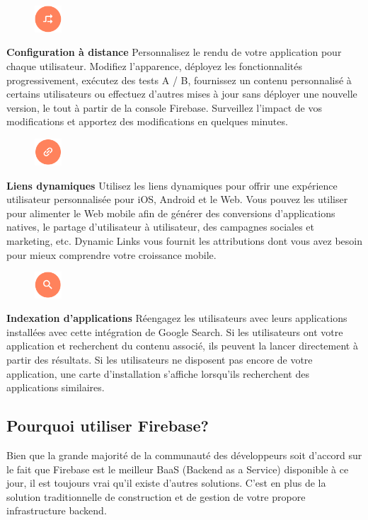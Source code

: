 \begin{figure}
	\includegraphics[width=1cm]{Images/chapter2/firebase_services/remote_config.png}
\end{figure}
\textbf{Configuration à distance} Personnalisez le rendu de votre application pour chaque utilisateur. Modifiez l'apparence, déployez les fonctionnalités progressivement, exécutez des tests A / B, fournissez un contenu personnalisé à certains utilisateurs ou effectuez d'autres mises à jour sans déployer une nouvelle version, le tout à partir de la console Firebase. Surveillez l'impact de vos modifications et apportez des modifications en quelques minutes.\medskip

\begin{figure}
	\includegraphics[width=1cm]{Images/chapter2/firebase_services/dynamic_links.png}
\end{figure}
\textbf{Liens dynamiques} Utilisez les liens dynamiques pour offrir une expérience utilisateur personnalisée pour iOS, Android et le Web. Vous pouvez les utiliser pour alimenter le Web mobile afin de générer des conversions d'applications natives, le partage d'utilisateur à utilisateur, des campagnes sociales et marketing, etc. Dynamic Links vous fournit les attributions dont vous avez besoin pour mieux comprendre votre croissance mobile.\medskip

\begin{figure}
	\includegraphics[width=1cm]{Images/chapter2/firebase_services/app_indexing.png}
\end{figure}
\textbf{Indexation d'applications} Réengagez les utilisateurs avec leurs applications installées avec cette intégration de Google Search. Si les utilisateurs ont votre application et recherchent du contenu associé, ils peuvent la lancer directement à partir des résultats. Si les utilisateurs ne disposent pas encore de votre application, une carte d'installation s'affiche lorsqu'ils recherchent des applications similaires.\medskip

\subsection{Pourquoi utiliser Firebase?}
Bien que la grande majorité de la communauté des développeurs soit d’accord sur le fait que Firebase est le meilleur BaaS (Backend as a Service) disponible à ce jour, il est toujours vrai qu’il existe d’autres solutions. C’est en plus de la solution traditionnelle de construction et de gestion de votre propore infrastructure backend.

